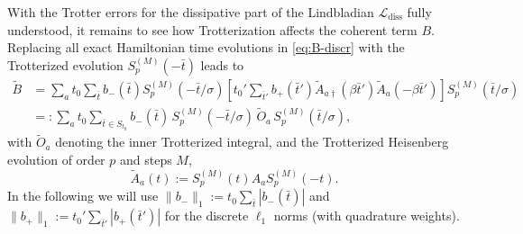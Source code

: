 \medskip
With the Trotter errors for the dissipative part of the Lindbladian $\mathcal{L}_\text{diss}$ fully understood, it remains to see how Trotterization affects the coherent term $B$. Replacing all exact Hamiltonian time evolutions in \eqref{eq:B-discr} with the Trotterized evolution $S_p^{(M)}(-\bar{t})$ leads to
\begin{equation} \label{eq:B-trotter}
    \begin{split}
         \tilde{B} &= \sum_a t_0\sum_{\bar{t}} b_-(\bar{t}) S_p^{(M)}(-\bar{t} / \sigma) \left[t_0'\sum_{\bar{t}'} b_+(\bar{t}') \tilde{A}_{a\dagger}(\beta \bar{t}') \tilde{A}_a(-\beta \bar{t}')\right]S_p^{(M)}(\bar{t} / \sigma) \\
         &=: \sum_{a} t_0 \sum_{\bar{t} \in S_{t_0}} b_-(\bar{t})\, S_p^{(M)}(-\bar{t}/\sigma)\, \tilde{O}_a\, S_p^{(M)}(\bar{t}/\sigma),
    \end{split}
\end{equation}
with $\tilde{O}_a$ denoting the inner Trotterized integral, and the Trotterized Heisenberg evolution of order $p$ and steps $M$, 
$$
\tilde{A}_a(t) := S_p^{(M)}(t) A_a S_p^{(M)}(-t).
$$
In the following we will use $\|b_-\|_{1} := t_0 \sum_{\bar{t}} |b_-(\bar{t})|$ and $\|b_+\|_{1} := t_0' \sum_{\bar{t}'} |b_+(\bar{t}')|$ for the discrete $\ell_1$ norms (with quadrature weights).

